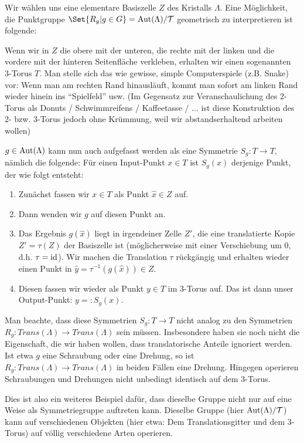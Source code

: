 \begin{remark}
Wir wählen uns eine elementare Basiszelle $Z$ des Kristalls $\Lambda$. Eine Möglichkeit, die Punktgruppe $\Set{R_g | g\in G}=\Aut(\Lambda)/\mathcal{T}$ geometrisch zu interpretieren ist folgende:

Wenn wir in $Z$ die obere mit der unteren, die rechte mit der linken und die vordere mit der hinteren Seitenfläche verkleben, erhalten wir einen sogenannten 3-Torus $T$. Man stelle sich das wie gewisse, simple Computerspiele (z.B. Snake) vor: Wenn man am rechten Rand hinausläuft, kommt man sofort am linken Rand wieder hinein ins \enquote{Spielfeld} usw. (Im Gegensatz zur Veranschaulichung des 2-Torus als Donuts / Schwimmreifens / Kaffeetasse / ... ist diese Konstruktion des 2- bzw. 3-Torus jedoch ohne Krümmung, weil wir abstandserhaltend arbeiten wollen)

\medbreak
$g\in\operatorname{Aut}(\Lambda)$ kann nun auch aufgefasst werden als eine Symmetrie $S_g: T\to T$, nämlich die folgende: Für einen Input-Punkt $x\in T$ ist $S_g(x)$ derjenige Punkt, der wie folgt entsteht:
\begin{enumerate}
\item Zunächst fassen wir $x\in T$ als Punkt $\hat{x}\in Z$ auf.
\item Dann wenden wir $g$ auf diesen Punkt an.
\item Das Ergebnis $g(\hat{x})$ liegt in irgendeiner Zelle $Z'$, die eine translatierte Kopie $Z'=\tau(Z)$ der Basiszelle ist (möglicherweise mit einer Verschiebung um $0$, d.h. $\tau=\operatorname{id}$). Wir machen die Translation $\tau$ rückgängig und erhalten wieder einen Punkt in $\hat{y}=\tau^{-1}(g(\hat{x}))\in Z$.
\item Diesen fassen wir wieder als Punkt $y\in T$ im 3-Torus auf. Das ist dann unser Output-Punkt: $y=:S_g(x)$.
\end{enumerate}

Man beachte, dass diese Symmetrien $S_g: T\to T$ nicht analog zu den Symmetrien $R_g: Trans(\Lambda)\to Trans(\Lambda)$ sein müssen. Insbesondere haben sie noch nicht die Eigenschaft, die wir haben wollen, dass translatorische Anteile ignoriert werden. Ist etwa $g$ eine Schraubung oder eine Drehung, so ist $R_g: Trans(\Lambda) \to Trans(\Lambda)$ in beiden Fällen eine Drehung. Hingegen operieren Schraubungen und Drehungen nicht unbedingt identisch auf dem 3-Torus.

Dies ist also ein weiteres Beispiel dafür, dass dieselbe Gruppe nicht nur auf eine Weise als Symmetriegruppe auftreten kann. Dieselbe Gruppe (hier $\operatorname{Aut}(\Lambda) /\mathcal{T}$) kann auf verschiedenen Objekten (hier etwa: Dem Translationsgitter und dem 3-Torus) auf völlig verschiedene Arten operieren.


\end{remark}
